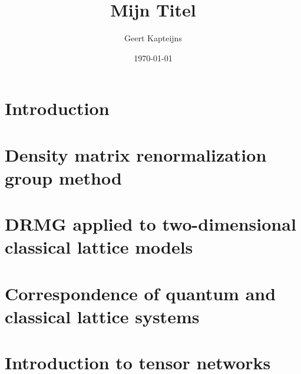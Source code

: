 \documentclass[9pt, ebook, openany, oneside]{memoir}
\renewcommand{\afterchaptertitle}{%
 \vskip2em
 \hrule height 0.6pt
 \vskip2em
 }
\begin{document}
\pagestyle{simple}



\frontmatter

\title{Mijn Titel}
\author{Geert Kapteijns}
\date{\today}


\begingroup
\renewcommand{\afterchaptertitle}{\vskip1.5em}

\tableofcontents*
\endgroup

\mainmatter

\chapter{Introduction}


\chapter{Density matrix renormalization group method}


\chapter{DRMG applied to two-dimensional classical lattice models}


% 



\appendix
\chapter{Correspondence of quantum and classical lattice
systems}\label{chapter:correspondence_quantum_classical}


\chapter{Introduction to tensor networks}




\backmatter
\printbibliography
\end{document}

